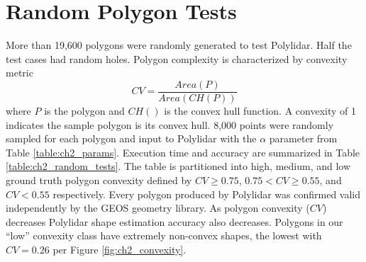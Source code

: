 \section{Random Polygon Tests}\label{sec:ch2_random_polygons_test}
More than 19,600 polygons were randomly generated to test Polylidar. Half the test cases had random holes.  Polygon complexity is characterized by convexity metric $$CV = \frac{Area(P)}{Area(CH(P))}$$
\noindent where $P$ is the polygon and $CH()$ is the convex hull function. A convexity of 1 indicates the sample polygon is its convex hull.
8,000 points were randomly sampled for each polygon and input to Polylidar with the $\alpha$ parameter from Table
\ref{table:ch2_params}.  Execution time and accuracy are summarized in Table \ref{table:ch2_random_tests}. The table is partitioned into high, medium, and low ground truth polygon convexity defined by $CV \geq 0.75$, $0.75 < CV \geq 0.55$, and $CV < 0.55$ respectively. 
Every polygon produced by Polylidar was confirmed valid independently by the GEOS geometry library.
As polygon convexity ($CV$) decreases Polylidar shape estimation accuracy also decreases. Polygons in our ``low'' convexity class have extremely non-convex shapes, the lowest with $CV=0.26$ per Figure \ref{fig:ch2_convexity}.

